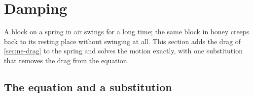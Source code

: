 \section{Damping}
\label{sec:os-damped}

A block on a spring in air swings for a long time; the same block in
honey creeps back to its resting place without swinging at all. This
section adds the drag of \cref{sec:ne-drag} to the spring and solves the
motion exactly, with one substitution that removes the drag from the
equation.

\subsection*{The equation and a substitution}

